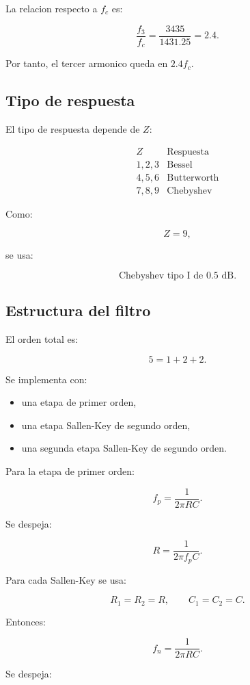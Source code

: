 \documentclass[11pt,letterpaper]{article}
\begin{document}
La relacion respecto a \(f_c\) es:

\[
\frac{f_3}{f_c}
=
\frac{3435}{1431.25}
=2.4.
\]

Por tanto, el tercer armonico queda en \(2.4f_c\).

\subsection{Tipo de respuesta}

El tipo de respuesta depende de \(Z\):

\[
\begin{array}{c|c}
Z & \text{Respuesta} \\
\hline
1,2,3 & \text{Bessel}\\
4,5,6 & \text{Butterworth}\\
7,8,9 & \text{Chebyshev}
\end{array}
\]

Como:

\[
Z=9,
\]

se usa:

\[
\boxed{\text{Chebyshev tipo I de 0.5 dB}}.
\]

\subsection{Estructura del filtro}

El orden total es:

\[
5=1+2+2.
\]

Se implementa con:

\begin{itemize}
  \item una etapa de primer orden,
  \item una etapa Sallen-Key de segundo orden,
  \item una segunda etapa Sallen-Key de segundo orden.
\end{itemize}

Para la etapa de primer orden:

\[
f_p=\frac{1}{2\pi RC}.
\]

Se despeja:

\[
R=\frac{1}{2\pi f_p C}.
\]

Para cada Sallen-Key se usa:

\[
R_1=R_2=R,
\qquad
C_1=C_2=C.
\]

Entonces:

\[
f_n=\frac{1}{2\pi RC}.
\]

Se despeja:
\end{document}
